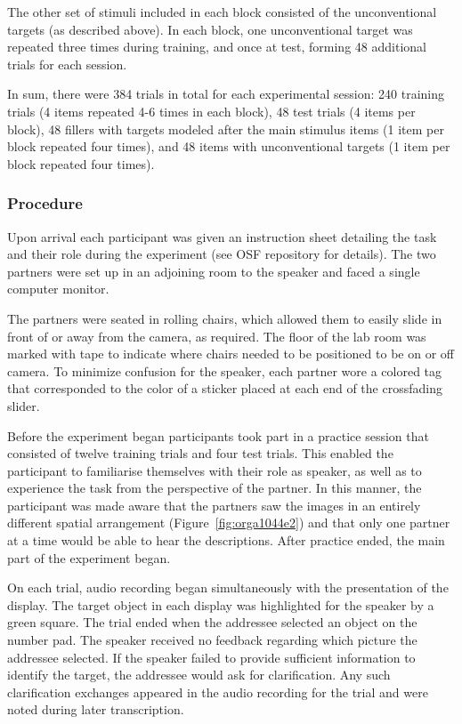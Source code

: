 \documentclass[natbib,man,a4paper]{apa6}
\begin{document}
The other set of stimuli included in each block consisted of the unconventional targets (as described above). In each block, one unconventional target was repeated three times during training, and once at test, forming 48 additional trials for each session.

In sum, there were 384 trials in total for each experimental session: 240 training trials (4 items repeated 4-6 times in each block), 48 test trials (4 items per block), 48 fillers with targets modeled after the main stimulus items (1 item per block repeated four times), and 48 items with unconventional targets (1 item per block repeated four times).

\subsubsection*{Procedure}
\label{sec:orga6fc65c}

Upon arrival each participant was given an instruction sheet detailing the task and their role during the experiment (see OSF repository for details). The two partners were set up in an adjoining room to the speaker and faced a single computer monitor. 

The partners were seated in rolling chairs, which allowed them to easily slide in front of or away from the camera, as required. The floor of the lab room was marked with tape to indicate where chairs needed to be positioned to be on or off camera. To minimize confusion for the speaker, each partner wore a colored tag that corresponded to the color of a sticker placed at each end of the crossfading slider. 

Before the experiment began participants took part in a practice session that consisted of twelve training trials and four test trials.  This enabled the participant to familiarise themselves with their role as speaker, as well as to experience the task from the perspective of the partner. In this manner, the participant was made aware that the partners saw the images in an entirely different spatial arrangement (Figure~\ref{fig:orga1044e2}) and that only one partner at a time would be able to hear the descriptions. After practice ended, the main part of the experiment began.

On each trial, audio recording began simultaneously with the presentation of the display. The target object in each display was highlighted for the speaker by a green square. The trial ended when the addressee selected an object on the number pad. The speaker received no feedback regarding which picture the addressee selected. If the speaker failed to provide sufficient information to identify the target, the addressee would ask for clarification. Any such clarification exchanges appeared in the audio recording for the trial and were noted during later transcription.
\end{document}
